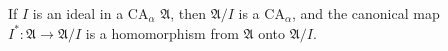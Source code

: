 If $I$ is an ideal in a $\mathrm{CA}_{\alpha}$ $\mathfrak{A}$, then $\mathfrak{A}/I$ is a $\mathrm{CA}_{\alpha}$, and the canonical map $I^{*} \colon \mathfrak{A} \to \mathfrak{A}/I$ is a homomorphism from $\mathfrak{A}$ onto $\mathfrak{A}/I$.
